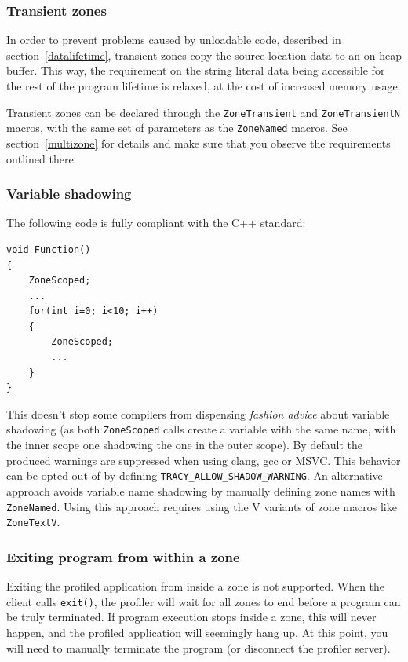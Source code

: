 \documentclass[hidelinks,titlepage,a4paper,twoside]{article}
\begin{document}
\subsubsection{Transient zones}
\label{transientzones}

In order to prevent problems caused by unloadable code, described in section~\ref{datalifetime}, transient zones copy the source location data to an on-heap buffer. This way, the requirement on the string literal data being accessible for the rest of the program lifetime is relaxed, at the cost of increased memory usage.

Transient zones can be declared through the \texttt{ZoneTransient} and \texttt{ZoneTransientN} macros, with the same set of parameters as the \texttt{ZoneNamed} macros. See section~\ref{multizone} for details and make sure that you observe the requirements outlined there.

\subsubsection{Variable shadowing}

The following code is fully compliant with the C++ standard:

\begin{lstlisting}
void Function()
{
	ZoneScoped;
	...
	for(int i=0; i<10; i++)
	{
		ZoneScoped;
		...
	}
}
\end{lstlisting}

This doesn't stop some compilers from dispensing \emph{fashion advice} about variable shadowing (as both \texttt{ZoneScoped} calls create a variable with the same name, with the inner scope one shadowing the one in the outer scope). By default the produced warnings are suppressed when using clang, gcc or MSVC. This behavior can be opted out of by defining \texttt{TRACY\_ALLOW\_SHADOW\_WARNING}. An alternative approach avoids variable name shadowing by manually defining zone names with \texttt{ZoneNamed}. Using this approach requires using the V variants of zone macros like \texttt{ZoneTextV}.

\subsubsection{Exiting program from within a zone}

Exiting the profiled application from inside a zone is not supported. When the client calls \texttt{exit()}, the profiler will wait for all zones to end before a program can be truly terminated. If program execution stops inside a zone, this will never happen, and the profiled application will seemingly hang up. At this point, you will need to manually terminate the program (or disconnect the profiler server).
\end{document}
